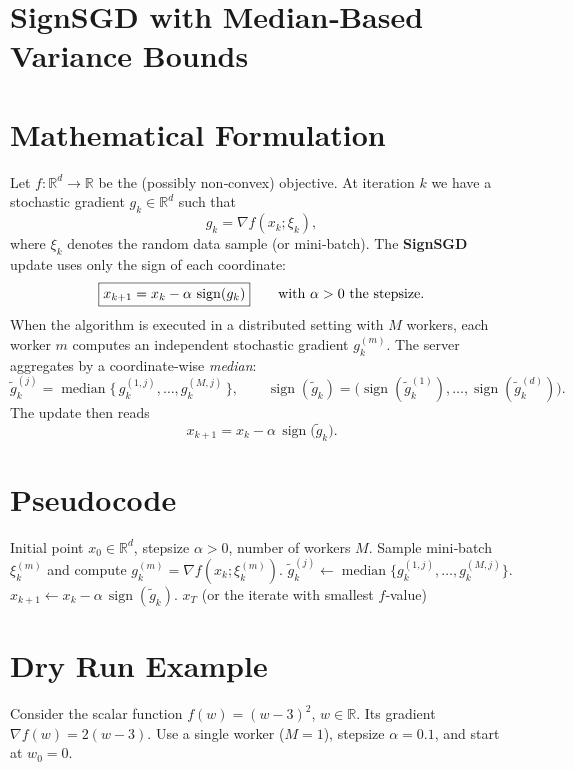 \documentclass{article}
\newcommand{\R}{\mathbb{R}}
\newcommand{\sign}{\operatorname{sign}}
\begin{document}
\section*{SignSGD with Median‑Based Variance Bounds}

\section*{Mathematical Formulation}
Let $f:\R^{d}\rightarrow\R$ be the (possibly non‑convex) objective.  
At iteration $k$ we have a stochastic gradient $g_k\in\R^{d}$ such that  
\[
g_k=\nabla f(x_k;\xi_k),
\]
where $\xi_k$ denotes the random data sample (or mini‑batch).  
The \textbf{SignSGD} update uses only the sign of each coordinate:
\[
\boxed{%
x_{k+1}=x_k-\alpha\,\sign(g_k)
}
\qquad\text{with }\alpha>0\text{ the stepsize.}
\]
When the algorithm is executed in a distributed setting with $M$ workers,
each worker $m$ computes an independent stochastic gradient $g_k^{(m)}$.
The server aggregates by a coordinate‑wise \emph{median}:
\[
\tilde{g}_k^{(j)}=\operatorname{median}\!\bigl\{\,g_k^{(1,j)},\dots,g_k^{(M,j)}\,\bigr\},
\qquad 
\sign(\tilde{g}_k) =\bigl(\sign(\tilde{g}_k^{(1)}),\dots,\sign(\tilde{g}_k^{(d)})\bigr) .
\]
The update then reads
\[
x_{k+1}=x_k-\alpha\,\sign\!\bigl(\tilde{g}_k\bigr).
\]

\section*{Pseudocode}
\begin{algorithm}[H]
\caption{SignSGD with Median Aggregation}
\begin{algorithmic}[1]
\REQUIRE Initial point $x_0\in\R^{d}$, stepsize $\alpha>0$, number of workers $M$.
        \STATE Sample mini‑batch $\xi_k^{(m)}$ and compute $g_k^{(m)}=\nabla f(x_k;\xi_k^{(m)})$.
    \ENDFOR
        \STATE $\tilde{g}_k^{(j)}\gets \operatorname{median}\{g_k^{(1,j)},\dots,g_k^{(M,j)}\}$.
    \ENDFOR
    \STATE $x_{k+1}\gets x_k-\alpha\,\sign(\tilde{g}_k)$.
\ENDFOR
\RETURN $x_T$ (or the iterate with smallest $f$‑value)
\end{algorithmic}
\end{algorithm}

\section*{Dry Run Example}
Consider the scalar function $f(w)=(w-3)^2$, $w\in\R$.  
Its gradient $\nabla f(w)=2(w-3)$.  Use a single worker ($M=1$), stepsize $\alpha=0.1$, and start at $w_0=0$.
\end{document}
